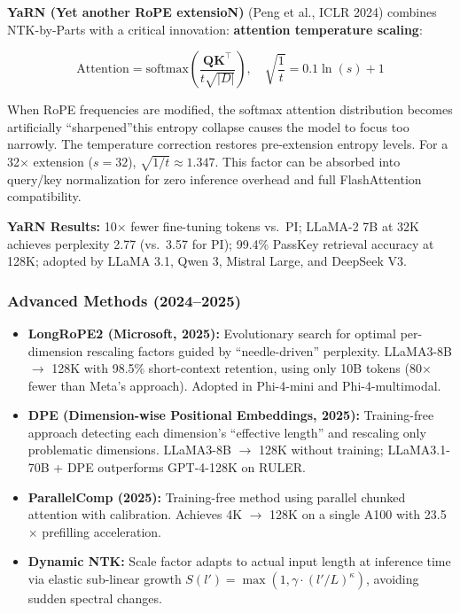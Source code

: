 \documentclass[11pt,a4paper]{article}
\begin{document}
\textbf{YaRN (Yet another RoPE extensioN)} (Peng et al., ICLR 2024) combines NTK-by-Parts with a critical innovation: \textbf{attention temperature scaling}:

\begin{equation}
\text{Attention} = \text{softmax}\!\left(\frac{\mathbf{Q}\mathbf{K}^\top}{t\sqrt{|D|}}\right),\quad \sqrt{\frac{1}{t}} = 0.1\ln(s) + 1
\end{equation}

When RoPE frequencies are modified, the softmax attention distribution becomes artificially ``sharpened''\textemdash this entropy collapse causes the model to focus too narrowly. The temperature correction restores pre-extension entropy levels. For a 32$\times$ extension ($s = 32$), $\sqrt{1/t} \approx 1.347$. This factor can be absorbed into query/key normalization for zero inference overhead and full FlashAttention compatibility.

\textbf{YaRN Results:} 10$\times$ fewer fine-tuning tokens vs.\ PI; LLaMA-2 7B at 32K achieves perplexity 2.77 (vs.\ 3.57 for PI); 99.4\% PassKey retrieval accuracy at 128K; adopted by LLaMA 3.1, Qwen 3, Mistral Large, and DeepSeek V3.

\subsubsection{Advanced Methods (2024--2025)}

\begin{itemize}[leftmargin=*]
    \item \textbf{LongRoPE2 (Microsoft, 2025):} Evolutionary search for optimal per-dimension rescaling factors guided by ``needle-driven'' perplexity. LLaMA3-8B $\to$ 128K with 98.5\% short-context retention, using only 10B tokens (80$\times$ fewer than Meta's approach). Adopted in Phi-4-mini and Phi-4-multimodal.
    \item \textbf{DPE (Dimension-wise Positional Embeddings, 2025):} Training-free approach detecting each dimension's ``effective length'' and rescaling only problematic dimensions. LLaMA3-8B $\to$ 128K without training; LLaMA3.1-70B + DPE outperforms GPT-4-128K on RULER.
    \item \textbf{ParallelComp (2025):} Training-free method using parallel chunked attention with calibration. Achieves 4K $\to$ 128K on a single A100 with 23.5$\times$ prefilling acceleration.
    \item \textbf{Dynamic NTK:} Scale factor adapts to actual input length at inference time via elastic sub-linear growth $S(l') = \max(1, \gamma \cdot (l'/L)^\kappa)$, avoiding sudden spectral changes.
\end{itemize}
\end{document}
